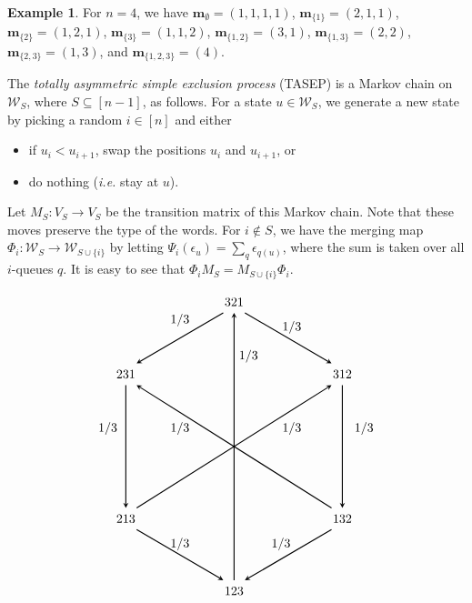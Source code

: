 \documentclass[reqno]{amsart}
\newcommand{\mbf}{\mathbf}
\newcommand{\0}{\phantom{c}}
\newcommand{\mcW}{\mathcal{W}}
\let\sumnonlimits\sum
\renewcommand{\sum}{\sumnonlimits\limits}
\newcommand{\defn}[1]{{\color{darkred}\emph{#1}}} %
\theoremstyle{plain}
\theoremstyle{definition}
\newtheorem{example}[thm]{Example}
\numberwithin{equation}{section}
\newcommand{\erik}[1]{\todo[size=\tiny,color=green!30]{#1 \\ \hfill --- Erik}}
\begin{document}
\begin{example}
  For $n = 4$, we have $\mbf{m}_\emptyset = (1,1,1,1)$, $\mbf{m}_{\{1\}} = (2,1,1)$, $\mbf{m}_{\{2\}} = (1,2,1)$, $\mbf{m}_{\{3\}} = (1,1,2)$, $\mbf{m}_{\{1,2\}} = (3,1)$, $\mbf{m}_{\{1,3\}} = (2,2)$, $\mbf{m}_{\{2,3\}} = (1,3)$, and $\mbf{m}_{\{1,2,3\}} = (4)$.
\end{example}


\erik{hypercube goes here}

The \defn{totally asymmetric simple exclusion process} (TASEP) is a Markov chain on $\mcW_S$, where $S \subseteq[n-1]$, as follows.
For a state $u \in \mcW_S$, we generate a new state by picking a random $i \in [n]$ and either
\begin{itemize}
\item if $u_i < u_{i+1}$, swap the positions $u_i$ and $u_{i+1}$, or
\item do nothing (\textit{i.e.} stay at $u$).
\end{itemize}
Let $M_S \colon V_S \to V_S$ be the transition matrix of this Markov chain.
Note that these moves preserve the type of the words.
For $i \notin S$, we have the merging map $\Phi_i \colon \mcW_S \to \mcW_{S\cup\{i\}}$ by letting $\Psi_i(\epsilon_u) = \sum_{q} \epsilon_{q(u)}$, where the sum is taken over all $i$-queues $q$.
It is easy to see that $\Phi_i M_S = M_{S\cup \{i\}} \Phi_i$. 

\newcommand{\exE} {
	\begin{tikzpicture} \draw (3,8) node {321}; \draw (0,6) node
{231}; \draw (6,6) node {312}; \draw (0,2) node {213}; \draw (6,2)
node {132}; \draw (3,0) node {123};

	\draw node at (1.5,7.5){$1/3$}; \draw node at
(4.6,7.3){$1/3$}; \draw node at (3.4,6.5){$1/3$};

	\draw node at (-0.5,4.5){$1/3$}; \draw node at
(6.6,4.5){$1/3$};

	\draw node at (1.5,4.5){$1/3$}; \draw node at
(4.6,4.5){$1/3$};

	\draw node at (1.5,1.3){$1/3$}; \draw node at
(4.3,1.3){$1/3$};

	\draw [->, >=stealth, thick] (2.7,7.7) -- (0.3,6.3);
\draw [->, >=stealth, thick] (3.3,7.7) --
(5.7,6.3); \draw [->, >=stealth, thick] (0,5.7) -- (0,2.3);
\draw [<-, >=stealth, thick] (2.7,0.3) --
(0.3,1.7); \draw [<-, >=stealth, thick] (3.3,0.3) -- (5.7,1.7);
\draw [<-, >=stealth, thick] (6,2.3) --
(6,5.7); \draw [->, >=stealth, thick] (3,0.3) -- (3,7.7);
\draw [->, >=stealth, thick] (5.7,2.3) --
(0.3,5.7); \draw [->, >=stealth, thick] (0.3,2.3) -- (5.7,5.7);
\end{tikzpicture} }
\[
\exE
\]
\end{document}
